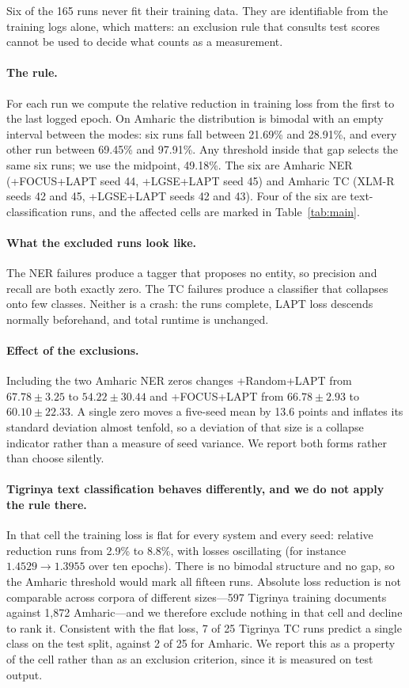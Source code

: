 \documentclass[11pt]{article}
\begin{document}
Six of the 165 runs never fit their training data. They are identifiable from
the training logs alone, which matters: an exclusion rule that consults test
scores cannot be used to decide what counts as a measurement.

\paragraph{The rule.} For each run we compute the relative reduction in
training loss from the first to the last logged epoch. On Amharic the
distribution is bimodal with an empty interval between the modes: six runs
fall between 21.69\% and 28.91\%, and every other run between 69.45\% and
97.91\%. Any threshold inside that gap selects the same six runs; we use the
midpoint, 49.18\%. The six are Amharic NER (+FOCUS+LAPT seed 44, +LGSE+LAPT
seed 45) and Amharic TC (XLM-R seeds 42 and 45, +LGSE+LAPT seeds 42 and 43).
Four of the six are text-classification runs, and the affected cells are
marked in Table~\ref{tab:main}.

\paragraph{What the excluded runs look like.} The NER failures produce a
tagger that proposes no entity, so precision and recall are both exactly
zero. The TC failures produce a classifier that collapses onto few classes.
Neither is a crash: the runs complete, LAPT loss descends normally
beforehand, and total runtime is unchanged.

\paragraph{Effect of the exclusions.} Including the two Amharic NER zeros
changes +Random+LAPT from $67.78 \pm 3.25$ to $54.22 \pm 30.44$ and
+FOCUS+LAPT from $66.78 \pm 2.93$ to $60.10 \pm 22.33$. A single zero moves a
five-seed mean by 13.6 points and inflates its standard deviation almost
tenfold, so a deviation of that size is a collapse indicator rather than a
measure of seed variance. We report both forms rather than choose silently.

\paragraph{Tigrinya text classification behaves differently, and we do not
apply the rule there.} In that cell the training loss is flat for every
system and every seed: relative reduction runs from 2.9\% to 8.8\%, with
losses oscillating (for instance $1.4529 \rightarrow 1.3955$ over ten
epochs). There is no bimodal structure and no gap, so the Amharic threshold
would mark all fifteen runs. Absolute loss reduction is not comparable across
corpora of different sizes---597 Tigrinya training documents against 1{,}872
Amharic---and we therefore exclude nothing in that cell and decline to rank
it. Consistent with the flat loss, 7 of 25 Tigrinya TC runs predict a single
class on the test split, against 2 of 25 for Amharic. We report this as a
property of the cell rather than as an exclusion criterion, since it is
measured on test output.
\end{document}
